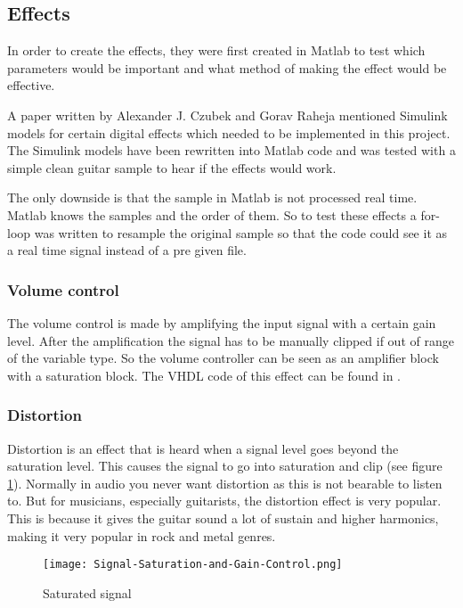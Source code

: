\subsection{Effects}
In order to create the effects, they were first created in Matlab to test which parameters would be important and what method of making the effect would be effective. 

A paper \cite{Guitar_Effects_Processor_Using_DSP} written by Alexander J. Czubek and Gorav Raheja mentioned Simulink models for certain digital effects which needed to be implemented in this project. The Simulink models have been rewritten into Matlab code and was tested with a simple clean guitar sample to hear if the effects would work. 

The only downside is that the sample in Matlab is not processed real time. Matlab knows the samples and the order of them. So to test these effects a for-loop was written to resample the original sample so that the code could see it as a real time signal instead of a pre given file.

\subsubsection{Volume control}
The volume control is made by amplifying the input signal with a certain gain level. After the amplification the signal has to be manually clipped if out of range of the variable type. So the volume controller can be seen as an amplifier block with a saturation block. The VHDL code of this effect can be found in .

\subsubsection{Distortion}
Distortion is an effect that is heard when a signal level goes beyond the saturation level. This causes the signal to go into saturation and clip (see figure \ref{fig:saturated_signal}). Normally in audio you never want distortion as this is not bearable to listen to. But for musicians, especially guitarists, the distortion effect is very popular. This is because it gives the guitar sound a lot of sustain and higher harmonics, making it very popular in rock and metal genres. 

\begin{figure}[ht]
    \centering
    \texttt{[image: Signal-Saturation-and-Gain-Control.png]}
    \caption{Saturated signal}
    \label{fig:saturated_signal}
\end{figure}

